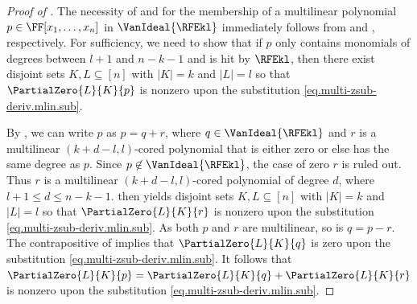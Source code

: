 \begin{proof}[Proof of ]
The necessity of  and  for the membership of a 
 multilinear polynomial $p \in \FF[x_1,\dots,x_n]$ in $\VanIdeal{\RFEkl}$ immediately follows from  and , respectively. For sufficiency, we need to show that if $p$ only contains monomials of degrees between $l+1$ and $n-k-1$ and is hit by $\RFEkl$, then there exist disjoint sets \(K,L\subseteq [n]\) with \(|K|=k\) and \(|L|=l\) so that \(\PartialZero{L}{K}{p}\) is nonzero upon the substitution \eqref{eq.multi-zsub-deriv.mlin.sub}.
 
 By , we can write $p$ as $p=q+r$, where $q \in \VanIdeal{\RFEkl}$ and $r$ is a multilinear \((k+d-l,l)\)-cored polynomial that is either zero or else has the same degree as $p$. Since $p \not\in \VanIdeal{\RFEkl}$, the case of zero $r$ is ruled out. Thus $r$ is a multilinear \((k+d-l,l)\)-cored polynomial of degree $d$, where $l+1 \le d \le n-k-1$.  then yields disjoint sets \(K,L\subseteq [n]\) with \(|K|=k\) and \(|L|=l\) so that \(\PartialZero{L}{K}{r}\) is nonzero upon the substitution \eqref{eq.multi-zsub-deriv.mlin.sub}. As both $p$ and $r$ are multilinear, so is $q = p-r$. The contrapositive of  implies that \(\PartialZero{L}{K}{q}\) is zero upon the substitution \eqref{eq.multi-zsub-deriv.mlin.sub}. It follows that \(\PartialZero{L}{K}{p} = \PartialZero{L}{K}{q} + \PartialZero{L}{K}{r}\) is nonzero upon the substitution \eqref{eq.multi-zsub-deriv.mlin.sub}.
\end{proof}